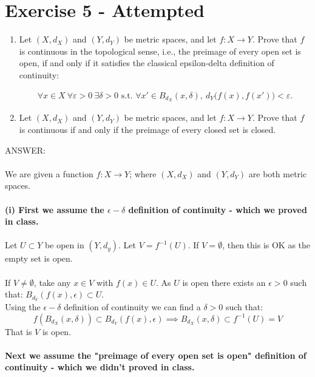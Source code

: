 \documentclass[12pt]{article}
\begin{document}
\newpage

\section*{Exercise 5 - Attempted}

\begin{enumerate}[label=\roman*)]
\item Let $(X,d_X)$ and $(Y,d_Y)$ be metric spaces, and let $f:X\to Y$. Prove that $f$ is continuous in the topological sense, i.e., the preimage of every open set is 
open, if and only if it satisfies the classical epsilon-delta definition of continuity:

\begin{align*}
\forall x\in X\ \forall\varepsilon>0\ \exists\delta>0
\text{ s.t. }\forall x'\in B_{d_X}(x,\delta),\ 
d_Y\bigl(f(x),f(x')\bigr)<\varepsilon.
\end{align*}

\item Let $(X,d_X)$ and $(Y,d_Y)$ be metric spaces, and let $f:X\to Y$. Prove that $f$ is continuous if and only if the preimage of every closed set is closed.

\end{enumerate}
\vspace{1cm}
\noindent
ANSWER:\\
\\
We are given a function $f: X \to Y$; where $(X, d_X)$ and $(Y, d_Y)$ are both metric spaces.\\
\\
\textbf{(i)
First we assume the $\epsilon - \delta$ definition of continuity - which we proved in class.}\\
\\
Let $U \subset Y$ be open in $(Y, d_y)$.  Let $V = f^{-1}(U)$.  If $V = \emptyset$, then this is OK
as the empty set is open.\\
\\
If $V \ne \emptyset$, take any $x \in V$ with $f(x) \in U$.  As $U$ is open there exists an $\epsilon > 0$ such that: $B_{d_Y}(f(x), \epsilon) \subset U$.\\
Using the $\epsilon - \delta$ definition of continuity we can find a $\delta > 0$ such that:\\
$$f(B_{d_X}(x, \delta)) \subset B_{d_Y}(f(x), \epsilon) \implies B_{d_X}(x, \delta) \subset f^{-1}(U) = V$$
That is $V$ is open.\\
\\
\textbf{Next we assume the "preimage of every open set is open" definition of continuity - which we didn't proved in class.}\\
\end{document}

